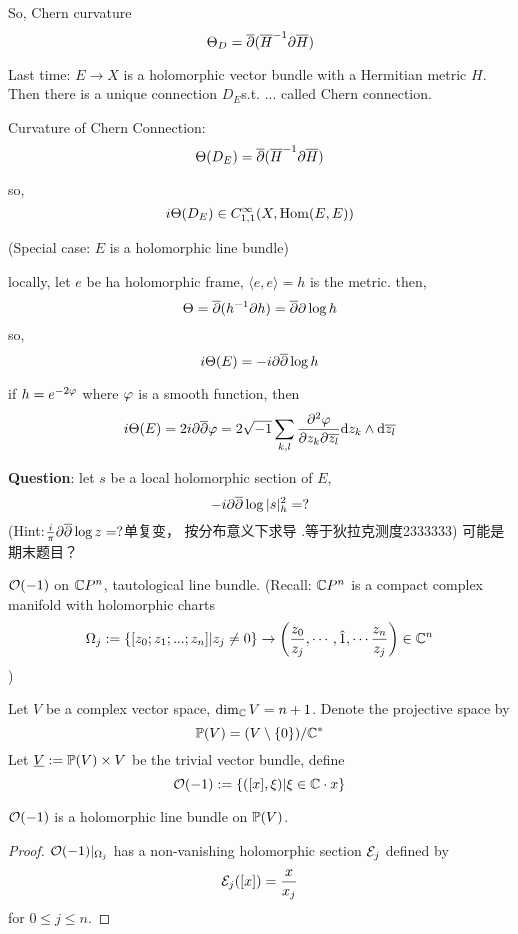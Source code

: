 So, Chern curvature
$$\Theta_D=\overline{\partial}(\overline{H}^{-1}\partial\overline{H})$$


Last time: $E\to X$ is a holomorphic vector bundle
with a Hermitian metric $H$.
Then there is a unique connection $D_E$s.t. ... called Chern connection.

Curvature of Chern Connection:
$$\Theta(D_E)=\overline{\partial}(\overline{H}^{-1}\partial\overline{H})$$

so,
$$i\Theta(D_E)\in C_{1,1}^\infty(X,\operatorname{Hom}(E,E))$$

\begin{example}(Special case: $E$ is  a holomorphic line bundle)

locally, let $e$ be ha holomorphic frame,
$\langle e,e\rangle=h$ is the metric.
then,
$$\Theta=\overline{\partial}(h^{-1}\partial h)=\overline{\partial}\partial\log h$$
so,
$$i\Theta(E)=-i\partial\overline{\partial}\log h$$
\end{example}
if $h=e^{-2\varphi}$ where $\varphi$ is a smooth function, then
$$i\Theta(E)=2i\partial\overline{\partial}\varphi
=2\sqrt{-1}\sum_{k,l}\frac{\partial^2{\varphi}} {\partial{z_k}\partial{\overline{z_l}}}
\mathrm{d} z_k\wedge\mathrm{d}\overline{z_l}
$$

\textbf{Question}: let $s$ be a local holomorphic section of $E$,
$$-i\partial\overline{\partial}\log|s|_h^2=?$$
(Hint:$\frac{i}{\pi}\partial\overline{\partial}\log z=?$单复变，
按分布意义下求导 .等于狄拉克测度2333333)
{\color{red}可能是期末题目？}

\begin{example}
$\mathcal{O}(-1)$ on $\mathbb{C} P^n$, tautological line bundle.
(Recall: $\mathbb{C} P^n$ is a compact complex manifold with holomorphic charts
$$\Omega_j:=\{[z_0;z_1;...;z_n]|z_j\neq 0\}\to
\left(
\frac{z_0}{z_j},\cdots,\hat{1},\cdots
\frac{z_n}{z_j}
\right)\in\mathbb{C}^n$$
)
\end{example}

Let $V$ be a complex vector space, $\dim_{\mathbb{C}} V=n+1$.
Denote the projective space by
$$\mathbb{P}(V)=(V\setminus\{0\})/\mathbb{C}^*$$
Let $\underline{V}:=\mathbb{P}(V)\times V$ be the trivial vector bundle,
define
$$\mathcal{O}(-1):=\{([x],\xi)|\xi\in\mathbb{C}\cdot x\}$$

\begin{prop}
$\mathcal{O}(-1)$ is a holomorphic line bundle on $\mathbb{P}(V)$.
\end{prop}
\begin{proof}
$\mathcal{O}(-1)|_{\Omega_j}$ has a non-vanishing holomorphic section $\mathcal{E}_j$ defined by
$$\mathcal{E}_j([x])=\frac{x}{x_j}$$
for $0\leq j\leq n$.
\end{proof}

